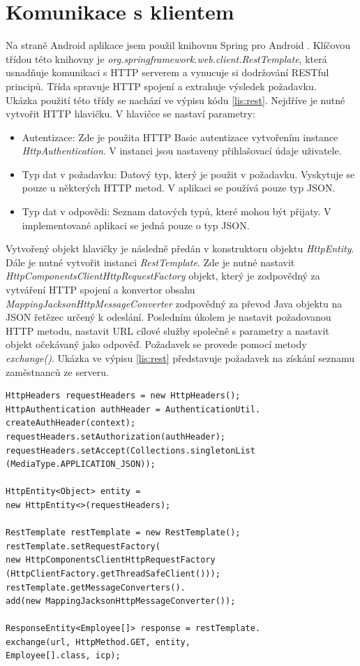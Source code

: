 \documentclass{diplomka}
\begin{document}
\section{Komunikace s klientem}
Na straně Android aplikace jsem použil knihovnu Spring pro Android \cite{springandroid}. Klíčovou třídou této knihovny je \emph{org.springframework.web.client.RestTemplate}, která usnadňuje komunikaci s HTTP serverem a vynucuje si dodržování RESTful principů. Třída spravuje HTTP spojení a extrahuje výsledek požadavku.\\ \indent
Ukázka použití této třídy se nachází ve výpisu kódu \ref{lis:rest}. Nejdříve je nutné vytvořit HTTP hlavičku. V hlavičce se nastaví parametry: 
\begin{itemize}[noitemsep,nolistsep]
\item Autentizace: Zde je použita HTTP Basic autentizace vytvořením instance \emph{HttpAuthentication}. V instanci jsou nastaveny přihlašovací údaje uživatele.
\item Typ dat v požadavku: Datový typ, který je použit v požadavku. Vyskytuje se pouze u některých HTTP metod. V aplikaci se používá pouze typ JSON.
\item Typ dat v odpovědi: Seznam datových typů, které mohou být přijaty. V implementované aplikaci se jedná pouze o typ JSON.
\end{itemize}
Vytvořený objekt hlavičky je následně předán v konstruktoru objektu \emph{HttpEntity}. Dále je nutné vytvořit instanci \emph{RestTemplate}. Zde je nutné nastavit \emph{HttpComponentsClientHttpRequestFactory} objekt, který je zodpovědný za vytváření HTTP spojení a konvertor obsahu \emph{MappingJacksonHttpMessageConverter} zodpovědný za převod Java objektu na JSON řetězec určený k odeslání. Posledním úkolem je nastavit požadovanou HTTP metodu, nastavit URL cílové služby společně s parametry a nastavit objekt očekávaný jako odpověď. Požadavek se provede pomocí metody \emph{exchange()}. Ukázka ve výpisu \ref{lis:rest} představuje požadavek na získání seznamu zaměstnanců ze serveru.

\begin{lstlisting}[label=lis:rest, caption=Ukázka použití RestTemplate]
HttpHeaders requestHeaders = new HttpHeaders();
HttpAuthentication authHeader = AuthenticationUtil.
createAuthHeader(context);
requestHeaders.setAuthorization(authHeader);
requestHeaders.setAccept(Collections.singletonList
(MediaType.APPLICATION_JSON));

HttpEntity<Object> entity = 
new HttpEntity<>(requestHeaders);

RestTemplate restTemplate = new RestTemplate();
restTemplate.setRequestFactory(
new HttpComponentsClientHttpRequestFactory
(HttpClientFactory.getThreadSafeClient()));
restTemplate.getMessageConverters().
add(new MappingJacksonHttpMessageConverter());

ResponseEntity<Employee[]> response = restTemplate.
exchange(url, HttpMethod.GET, entity, 
Employee[].class, icp);
\end{lstlisting}
\end{document}
